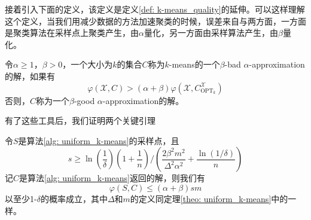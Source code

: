 接着引入下面的定义，该定义是定义\ref{def: k-means_quality}的延伸。可以这样理解这个定义，当我们用减少数据的方法加速聚类的时候，误差来自与两方面，一方面是聚类算法在采样点上聚类产生，由$\alpha$量化，另一方面由采样算法产生，由$\beta$量化。
\begin{definition}[$k$-means问题解的质量2]
    令$\alpha \geq 1$，$\beta > 0$，一个大小为$k$的集合$C$称为$k$-means的一个$\beta$-bad $\alpha$-approximation的解，如果有
    \begin{equation}
    \varphi(\mathcal{X},C) > (\alpha + \beta)\varphi(\mathcal{X},C_{\text{OPT}_k}^\mathcal{X})
    \end{equation}
    否则，$C$称为一个$\beta$-good $\alpha$-approximation的解。
\end{definition}
有了这些工具后，我们证明两个关键引理
\begin{lemma}
    \label{lem: S->C}
    令$S$是算法\ref{alg: uniform_k-means}的采样点，且
    \begin{equation}
    s \geq \ln(\frac{1}{\delta})(1+\frac{1}{n})/(\frac{2\beta^2 m^2}{\Delta^2 \alpha^2}+\frac{\ln(1/\delta)}{n})
    \end{equation}
    记$C$是算法\ref{alg: uniform_k-means}返回的解，则我们有
    \begin{equation}
    \varphi(S,C) \leq (\alpha + \beta)sm
    \end{equation}
    以至少1-$\delta$的概率成立，其中$\Delta$和$m$的定义同定理\ref{theo: uniform_k-means}中的一样。
\end{lemma}
